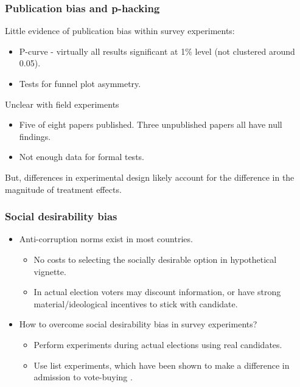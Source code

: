 \documentclass[usenames,dvipsnames]{beamer}
\begin{document}

\begin{frame}
\frametitle{Publication bias and p-hacking}
\textcolor{Cerulean}{Little evidence of publication bias} within survey experiments:
\pause
\begin{itemize}
\item P-curve - virtually all results significant at 1\% level (not clustered around 0.05).
\pause
\item Tests for funnel plot asymmetry. \hyperlink{funnel}{}
\end{itemize}
\pause
Unclear with field experiments
\begin{itemize}
\item Five of eight papers published. Three unpublished papers all have null findings. 
\pause
\item Not enough data for formal tests. 
\end{itemize}
\pause
But, \textcolor{Cerulean}{differences in experimental design} likely account for the difference in the magnitude of treatment effects.

\end{frame}

\begin{frame}
\frametitle{Social desirability bias}
\begin{itemize}
\pause
\item Anti-corruption norms exist in most countries.
\begin{itemize}
\pause
\item No costs to selecting the socially desirable option in hypothetical vignette. 
\pause
\item In actual election voters may discount information, or have strong material/ideological incentives to stick with candidate.
\end{itemize}
\pause
\item How to overcome social desirability bias in survey experiments?
\begin{itemize}
\pause
\item Perform experiments during \textcolor{Cerulean}{actual elections} using real candidates.
\pause
\item Use \textcolor{Cerulean}{list experiments}, which have been shown to make a difference in admission to vote-buying \citep{gonzalez2012vote}.
\end{itemize}
\end{itemize}

\end{frame}
\end{document}
